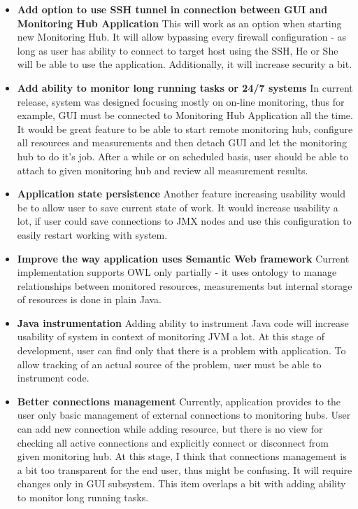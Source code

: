 \begin{itemize}
\item {\bf Add option to use SSH tunnel in connection between GUI and Monitoring Hub Application}
This will work as an option when starting new Monitoring Hub. It will allow bypassing every firewall configuration - as long as user has ability to connect to target host using the SSH, He or She will be able to use the application. Additionally, it will increase security a bit.
\item {\bf Add ability to monitor long running tasks or 24/7 systems } 
In current release, system was designed focusing mostly on on-line monitoring, thus for example, GUI must be connected to Monitoring Hub Application all the time. It would be great feature to be able to start remote monitoring hub, configure all resources and measurements and then detach GUI and let the monitoring hub to do it\rq{}s job. After a while or on scheduled basis, user should be able to attach to given monitoring hub and review all measurement results.
\item {\bf Application state persistence } 
Another feature increasing usability would be to allow user to save current state of work. It would increase usability a lot, if user could save connections to JMX nodes and use this configuration to easily restart working with system. 
\item {\bf Improve the way application uses Semantic Web framework} 
Current implementation supports OWL only partially - it uses ontology to manage relationships between monitored resources, measurements but internal storage of resources is done in plain Java.
\item {\bf Java instrumentation}
Adding ability to instrument Java code will increase usability of system in context of monitoring JVM a lot. At this stage of development, user can find only that there is a problem with application. To allow tracking of an actual source of the problem, user must be able to instrument code. 
\item {\bf Better connections management}
Currently, application provides to the user only basic management of external connections to monitoring hubs. User can add new connection while adding resource, but there is no view for checking all active connections and explicitly connect or disconnect from given monitoring hub. At this stage, I think that connections management is a bit too transparent for the end user, thus might be confusing. It will require changes only in GUI subsystem. This item overlaps a bit with adding ability to monitor long running tasks.

\end{itemize}
